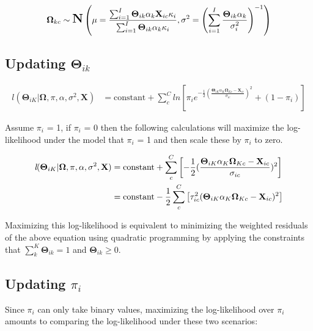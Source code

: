 \begin{align}
\mathbf{\Omega}_{kc} \sim \mbox{\Large \textbf{N}}\left(\mu = \frac{\sum_{i = 1}^{I}\mathbf{\Theta}_{ik}\alpha_{k}\textbf{X}_{ic}\kappa_{i}}{\sum_{i = 1}^{I}\mathbf{\Theta}_{ik}\alpha_{k}\kappa_{i}}, \sigma^{2} =  \left(\sum_{i = 1}^{I}\frac{\mathbf{\Theta}_{ik}\alpha_{k}}{\sigma^{2}_{i}}\right)^{-1} \right)\label{EM:omega}
\end{align}

\subsection*{Updating $\mathbf{\Theta}_{ik}$}

\begin{align}
\textit{l}(\mathbf{\Theta}_{iK} | \mathbf{\Omega}, \pi, \alpha, \sigma^{2}, \textbf{X}) &= \text{constant} + \sum_{c}^{C}ln\left[\pi_{i}e^{-\frac{1}{2}(\frac{\mathbf{\Theta}_{iK}\alpha_{K}\mathbf{\Omega}_{Kc} - \textbf{X}_{ic}}{\sigma_{ic}})^2} + (1-\pi_{i})\right]\label{EM:theta}
\end{align}

Assume $\pi_{i}$ = 1, if $\pi_{i}$ = 0 then the following calculations will maximize the log-likelihood under the model that $\pi_{i}$ = 1 and then scale these by $\pi_{i}$ to zero.

\begin{align}
\textit{l}(\mathbf{\Theta}_{iK} | \mathbf{\Omega}, \pi, \alpha, \sigma^{2}, \textbf{X}) &= \text{constant} + \sum_{c}^{C}\left[{-\frac{1}{2}(\frac{\mathbf{\Theta}_{iK}\alpha_{K}\mathbf{\Omega}_{Kc} - \textbf{X}_{ic}}{\sigma_{ic}})^2}\right]\notag\\
 &= \text{constant} -\frac{1}{2}\sum_{c}^{C}\left[{\tau_{ic}^{2}(\mathbf{\Theta}_{iK}\alpha_{K}\mathbf{\Omega}_{Kc} - \textbf{X}_{ic})^2}\right]\label{EM:pi}
\end{align}

Maximizing this log-likelihood is equivalent to minimizing the weighted residuals of the above equation using quadratic programming by applying the constraints that $\sum_{k}^{K}\mathbf{\Theta}_{ik} = 1$ and $\mathbf{\Theta}_{ik} \ge 0$.

\subsection*{Updating $\pi_{i}$}

Since $\pi_{i}$ can only take binary values, maximizing the log-likelihood over $\pi_{i}$ amounts to comparing the log-likelihood under these two scenarios:


